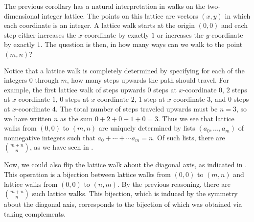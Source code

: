 \begin{remark}
  The previous corollary has a natural interpretation in walks on the two-dimensional integer lattice. The points on this lattice are vectors $(x,y)$ in which each coordinate is an integer. A lattice walk starts at the origin $(0,0)$ and each step either increases the $x$-coordinate by exactly $1$ or increases the $y$-coordinate by exactly $1$. The question is then, in how many ways can we walk to the point $(m,n)$?

Notice that a lattice walk is completely determined by specifying for each of the integers $0$ through $m$, how many steps upwards the path should travel. For example, the first lattice walk of  steps upwards $0$ steps at $x$-coordinate $0$, $2$ steps at $x$-coordinate $1$, $0$ steps at $x$-coordinate $2$, $1$ step at $x$-coordinate $3$, and $0$ steps at $x$-coordinate $4$. The total number of steps traveled upwards must be $n=3$, so we have written $n$ as the sum $0+2+0+1+0=3$. Thus we see that lattice walks from $(0,0)$ to $(m,n)$ are uniquely determined by lists $(a_0,...,a_m)$ of nonnegative integers such that $a_0+\cdots+\cdots a_m=n$. Of such lists, there are $\binom{m+n}{n}$, as we have seen in .

Now, we could also flip the lattice walk about the diagonal axis, as indicated in . This operation is a bijection between lattice walks from $(0,0)$ to $(m,n)$ and lattice walks from $(0,0)$ to $(n,m)$. By the previous reasoning, there are $\binom{m+n}{n}$ such lattice walks. This bijection, which is induced by the symmetry about the diagonal axis, corresponds to the bijection of  which was obtained via taking complements.
\end{remark}

